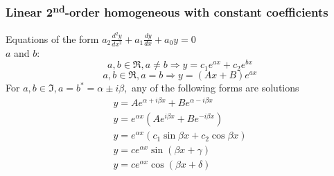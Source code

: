 \documentclass[letterpaper,landscape,10pt]{article}
\begin{document}
{\begin{multicols}{3}
		\subsubsection*{Linear 2\textsuperscript{nd}-order homogeneous with
				constant coefficients}
			Equations of the form $a_2 \frac{d^2y}{dx^2} + a_1 \frac{dy}{dx} + a_0y = 0$ \\
			$a$ and $b$:\\
			$$
				a, b \in \Re, a \neq b \Rightarrow
					y=c_1e^{ax}+c_2e^{bx}
			$$
			$$
				a, b \in \Re, a = b \Rightarrow y=(Ax+B)e^{ax}
			$$
			For $a, b \in \Im, a = b^\ast = \alpha \pm i\beta,$ any of the
			following forms are solutions\\
			\begin{gather*}
				y=Ae^{\alpha + i\beta x} + Be^{\alpha - i\beta x}\\
				y=e^{\alpha x}\left(Ae^{i\beta x} + Be^{-i\beta x}\right)\\
				y=e^{\alpha x}\left(c_1\sin\beta x + c_2\cos\beta x\right)\\
				y=ce^{\alpha x}\sin\left( \beta x + \gamma \right)\\
				y=ce^{\alpha x}\cos\left( \beta x + \delta \right)
			\end{gather*}


\end{multicols}}
\end{document}
